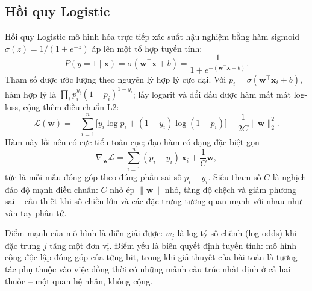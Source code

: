 \documentclass[12pt,a4paper,oneside]{report}
\begin{document}
\subsection{Hồi quy Logistic}
Hồi quy Logistic mô hình hóa trực tiếp xác suất hậu nghiệm bằng hàm sigmoid
$\sigma(z) = 1/(1 + e^{-z})$ áp lên một tổ hợp tuyến tính:
\begin{equation}
  P(y = 1 \mid \mathbf{x}) = \sigma(\mathbf{w}^{\top}\mathbf{x} + b)
  = \frac{1}{1 + e^{-(\mathbf{w}^{\top}\mathbf{x} + b)}} .
  \label{eq:sigmoid}
\end{equation}
Tham số được ước lượng theo nguyên lý hợp lý cực đại. Với $p_i = \sigma(\mathbf{w}^{\top}\mathbf{x}_i + b)$,
hàm hợp lý là $\prod_i p_i^{y_i}(1 - p_i)^{1-y_i}$; lấy logarit và đổi dấu được
hàm mất mát log-loss, cộng thêm điều chuẩn L2:
\begin{equation}
  \mathcal{L}(\mathbf{w}) = -\sum_{i=1}^{n}
  \Big[ y_i \log p_i + (1 - y_i)\log(1 - p_i) \Big]
  + \frac{1}{2C}\lVert \mathbf{w} \rVert_2^{2} .
  \label{eq:logloss}
\end{equation}
Hàm này lồi nên có cực tiểu toàn cục; đạo hàm có dạng đặc biệt gọn
\begin{equation}
  \nabla_{\mathbf{w}} \mathcal{L} = \sum_{i=1}^{n} (p_i - y_i)\,\mathbf{x}_i
  + \frac{1}{C}\mathbf{w},
  \label{eq:grad}
\end{equation}
tức là mỗi mẫu đóng góp theo đúng phần sai số $p_i - y_i$. Siêu tham số
$C$ là nghịch đảo độ mạnh điều chuẩn: $C$ nhỏ ép $\lVert\mathbf{w}\rVert$ nhỏ,
tăng độ chệch và giảm phương sai -- cần thiết khi số chiều lớn và các đặc trưng
tương quan mạnh với nhau như vân tay phân tử.

Điểm mạnh của mô hình là diễn giải được: $w_j$ là log tỷ số chênh (log-odds)
khi đặc trưng $j$ tăng một đơn vị. Điểm yếu là biên quyết định tuyến tính:
mô hình cộng độc lập đóng góp của từng bit, trong khi giả thuyết của bài
toán là tương tác phụ thuộc vào việc đồng thời có những mảnh cấu trúc
nhất định ở cả hai thuốc -- một quan hệ nhân, không cộng.
\end{document}

